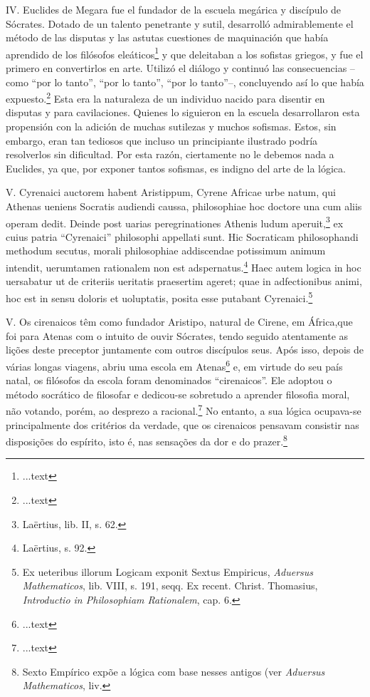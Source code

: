 \documentclass{article}
\begin{document}
\begin{paracol}{3}
\begin{nthcolumn}{2}
    IV. Euclides de Megara fue el fundador de la escuela megárica y discípulo de Sócrates. Dotado de un talento penetrante y sutil, desarrolló admirablemente el método de las disputas y las astutas cuestiones de maquinación que había aprendido de los filósofos eleáticos\footnote[24]{...text} y que deleitaban a los sofistas griegos, y fue el primero en convertirlos en arte. Utilizó el diálogo y continuó las consecuencias –como “por lo tanto”, “por lo tanto”, “por lo tanto”–, concluyendo así lo que había expuesto.\footnote[25]{...text} Esta era la naturaleza de un individuo nacido para disentir en disputas y para cavilaciones. Quienes lo siguieron en la escuela desarrollaron esta propensión con la adición de muchas sutilezas y muchos sofismas. Estos, sin embargo, eran tan tediosos que incluso un principiante ilustrado podría resolverlos sin dificultad. Por esta razón, ciertamente no le debemos nada a Euclides, ya que, por exponer tantos sofismas, es indigno del arte de la lógica.
  \end{nthcolumn}
  \vspace{0.5cm}
  \begin{nthcolumn*}{0} %
    V. Cyrenaici auctorem habent Aristippum, Cyrene Africae urbe natum, qui Athenas ueniens Socratis audiendi caussa, philosophiae hoc doctore una cum aliis operam dedit. Deinde post uarias peregrinationes Athenis ludum aperuit,\footnote[26]{Laërtius, lib. II, s. 62.} ex cuius patria “Cyrenaici” philosophi appellati sunt. Hic Socraticam philosophandi methodum secutus, morali philosophiae addiscendae potissimum animum intendit, uerumtamen rationalem non est adspernatus.\footnote[27]{Laërtius, s. 92.} Haec autem logica in hoc uersabatur ut de criteriis ueritatis praesertim ageret; quae in adfectionibus animi, hoc est in sensu doloris et uoluptatis, posita esse putabant Cyrenaici.\footnote[28]{Ex ueteribus illorum Logicam exponit Sextus Empiricus, \emph{Aduersus Mathematicos}, lib. VIII, s. 191, seqq. Ex recent. Christ. Thomasius, \emph{Introductio in Philosophiam Rationalem}, cap. 6.}
  \end{nthcolumn*}
  \vspace{0.5cm}
  \begin{nthcolumn}{1} %
    V. Os cirenaicos têm como fundador Aristipo, natural de Cirene, em África,que foi para Atenas com o intuito de ouvir Sócrates, tendo seguido atentamente as lições deste preceptor juntamente com outros discípulos seus. Após isso, depois de várias longas viagens, abriu uma escola em Atenas\footnote[26]{...text} e, em virtude do seu país natal, os filósofos da escola foram denominados “cirenaicos”. Ele adoptou o método socrático de filosofar e dedicou-se sobretudo a aprender filosofia moral, não votando, porém, ao desprezo a racional.\footnote[27]{...text} No entanto, a sua lógica ocupava-se principalmente dos critérios da verdade, que os cirenaicos pensavam consistir nas disposições do espírito, isto é, nas sensações da dor e do prazer.\footnote[28]{Sexto Empírico expõe a lógica com base nesses antigos (ver \emph{Aduersus Mathematicos}, liv.
}
\end{nthcolumn}
\end{paracol}
\end{document}
